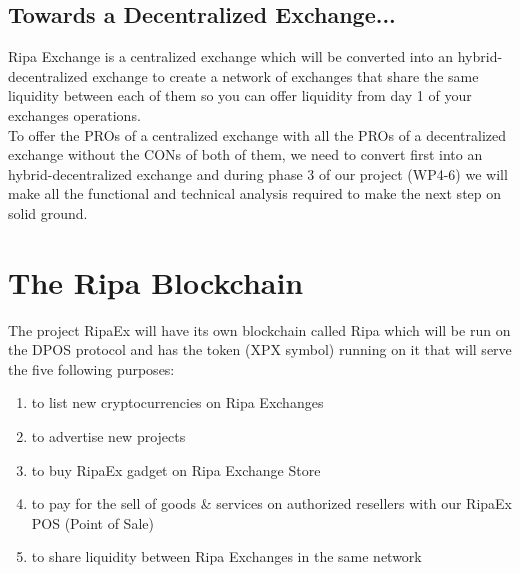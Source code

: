 \documentclass[11pt,fleqn,oneside]{book} %
\begin{document}
\section{Towards a Decentralized Exchange...}
Ripa Exchange is a centralized exchange which will be converted into an hybrid-decentralized exchange to create a network of exchanges
that share the same liquidity between each of them so you can offer liquidity from day 1 of your exchanges operations.\\

To offer the PROs of a centralized exchange with all the PROs of a decentralized exchange without the CONs of both of them, 
we need to convert first into an hybrid-decentralized exchange and during phase 3 of our project (WP4-6) we will make all the 
functional and technical analysis required to make the next step on solid ground.




\chapter{The Ripa Blockchain}
\label{sec:theRipaBlockchain}
The project RipaEx will have its own blockchain called Ripa which will be run on the DPOS protocol and has the \PHP 
token (XPX symbol) running on it that will serve the five following purposes:
	\begin{enumerate}
		\item to list new cryptocurrencies on Ripa Exchanges
		\item to advertise new projects
		\item to buy RipaEx gadget on Ripa Exchange Store
		\item to pay for the sell of goods \& services on authorized resellers with our RipaEx POS (Point of Sale)
		\item to share liquidity between Ripa Exchanges in the same network
	\end{enumerate}
\end{document}
